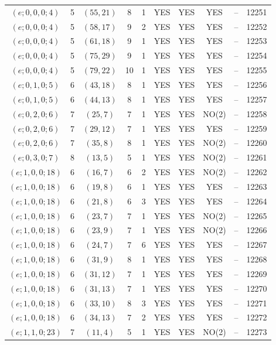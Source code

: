 \begin{longtable}{|c|c|c|c|c|c|c|c|c|c|}
$(e; 0, 0, 0; 4)$ & 5 & $(55, 21)$ & 8 & 1 & YES & YES & YES & -- & 12251\\
$(e; 0, 0, 0; 4)$ & 5 & $(58, 17)$ & 9 & 2 & YES & YES & YES & -- & 12252\\
$(e; 0, 0, 0; 4)$ & 5 & $(61, 18)$ & 9 & 1 & YES & YES & YES & -- & 12253\\
$(e; 0, 0, 0; 4)$ & 5 & $(75, 29)$ & 9 & 1 & YES & YES & YES & -- & 12254\\
$(e; 0, 0, 0; 4)$ & 5 & $(79, 22)$ & 10 & 1 & YES & YES & YES & -- & 12255\\
$(e; 0, 1, 0; 5)$ & 6 & $(43, 18)$ & 8 & 1 & YES & YES & YES & -- & 12256\\
$(e; 0, 1, 0; 5)$ & 6 & $(44, 13)$ & 8 & 1 & YES & YES & YES & -- & 12257\\
$(e; 0, 2, 0; 6)$ & 7 & $(25, 7)$ & 7 & 1 & YES & YES & NO(2) & -- & 12258\\
$(e; 0, 2, 0; 6)$ & 7 & $(29, 12)$ & 7 & 1 & YES & YES & YES & -- & 12259\\
$(e; 0, 2, 0; 6)$ & 7 & $(35, 8)$ & 8 & 1 & YES & YES & NO(2) & -- & 12260\\
$(e; 0, 3, 0; 7)$ & 8 & $(13, 5)$ & 5 & 1 & YES & YES & NO(2) & -- & 12261\\
$(e; 1, 0, 0; 18)$ & 6 & $(16, 7)$ & 6 & 2 & YES & YES & NO(2) & -- & 12262\\
$(e; 1, 0, 0; 18)$ & 6 & $(19, 8)$ & 6 & 1 & YES & YES & YES & -- & 12263\\
$(e; 1, 0, 0; 18)$ & 6 & $(21, 8)$ & 6 & 3 & YES & YES & YES & -- & 12264\\
$(e; 1, 0, 0; 18)$ & 6 & $(23, 7)$ & 7 & 1 & YES & YES & NO(2) & -- & 12265\\
$(e; 1, 0, 0; 18)$ & 6 & $(23, 9)$ & 7 & 1 & YES & YES & NO(2) & -- & 12266\\
$(e; 1, 0, 0; 18)$ & 6 & $(24, 7)$ & 7 & 6 & YES & YES & YES & -- & 12267\\
$(e; 1, 0, 0; 18)$ & 6 & $(31, 9)$ & 8 & 1 & YES & YES & YES & -- & 12268\\
$(e; 1, 0, 0; 18)$ & 6 & $(31, 12)$ & 7 & 1 & YES & YES & YES & -- & 12269\\
$(e; 1, 0, 0; 18)$ & 6 & $(31, 13)$ & 7 & 1 & YES & YES & YES & -- & 12270\\
$(e; 1, 0, 0; 18)$ & 6 & $(33, 10)$ & 8 & 3 & YES & YES & YES & -- & 12271\\
$(e; 1, 0, 0; 18)$ & 6 & $(34, 13)$ & 7 & 2 & YES & YES & YES & -- & 12272\\
$(e; 1, 1, 0; 23)$ & 7 & $(11, 4)$ & 5 & 1 & YES & YES & NO(2) & -- & 12273\\

\end{longtable}
